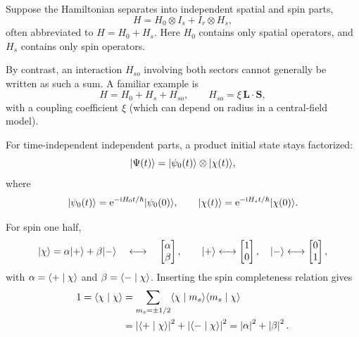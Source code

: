 Suppose the Hamiltonian separates into independent spatial and spin
parts,
\[
 H=H_0\otimes I_s+I_r\otimes H_s,
\]
often abbreviated to $H=H_0+H_s$. Here $H_0$ contains only spatial
operators, and $H_s$ contains only spin operators.

By contrast, an interaction $H_{so}$ involving both sectors cannot
generally be written as such a sum. A familiar example is
\[
 H=H_0+H_s+H_{so},\qquad H_{so}=\xi\,\mathbf L\cdot\mathbf S,
\]
with a coupling coefficient $\xi$ (which can depend on radius in
a central-field model).

For time-independent independent parts, a product initial state stays
factorized:
\[
 \lvert \Psi(t)\rangle=\lvert \psi_0(t)\rangle\otimes\lvert \chi(t)\rangle,
\]
where
\[
 \lvert \psi_0(t)\rangle=\mathrm{e}^{-\mathrm{i} H_0t/\hbar}\lvert \psi_0(0)\rangle,\qquad
 \lvert \chi(t)\rangle=\mathrm{e}^{-\mathrm{i} H_st/\hbar}\lvert \chi(0)\rangle.
\]

For spin one half,
\[
 \lvert \chi\rangle=\alpha\lvert +\rangle+\beta\lvert -\rangle
 \quad\longleftrightarrow\quad
 \begin{bmatrix}\alpha\\\beta\end{bmatrix},
 \qquad
 \lvert +\rangle\longleftrightarrow\begin{bmatrix}1\\0\end{bmatrix},\quad
 \lvert -\rangle\longleftrightarrow\begin{bmatrix}0\\1\end{bmatrix},
\]
with $\alpha=\langle +\mid \chi\rangle$ and $\beta=\langle -\mid \chi\rangle$.
Inserting the spin completeness relation gives
\begin{align*}
 1=\langle \chi\mid \chi\rangle
 &=\sum_{m_s=\pm1/2}\langle \chi\mid m_s\rangle\langle m_s\mid \chi\rangle\\
 &=\left\lvert\langle +\mid \chi\rangle\right\rvert^2+\left\lvert\langle -\mid \chi\rangle\right\rvert^2
 =\left\lvert\alpha\right\rvert^2+\left\lvert\beta\right\rvert^2.
\end{align*}
